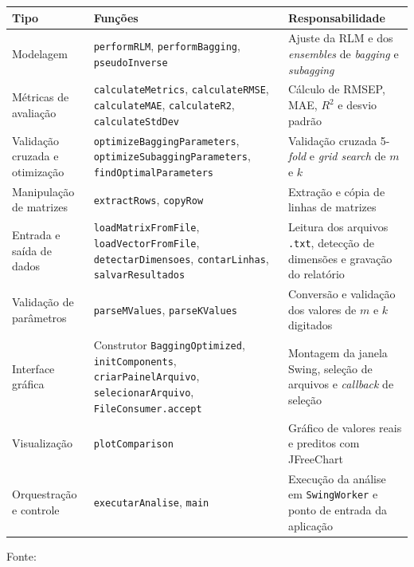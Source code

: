 \begin{quadro}[ht]
\begin{center}
\footnotesize
\captionsetup{justification=centering, labelsep=endash, width=0.75\linewidth}
\caption{Tipos de funções do sistema Java legado.}
\label{tab:tipos_java}
\begin{threeparttable}
\renewcommand{\arraystretch}{1.15}
\begin{tabularx}{\textwidth}{|>{\raggedright\arraybackslash}p{3.2cm}|>{\raggedright\arraybackslash}X|>{\raggedright\arraybackslash}X|}
\hline
\textbf{Tipo} & \textbf{Funções} & \textbf{Responsabilidade} \\ \hline
Modelagem & \texttt{performRLM}, \texttt{performBagging}, \texttt{pseudoInverse} & Ajuste da RLM e dos \textit{ensembles} de \textit{bagging} e \textit{subagging} \\ \hline
Métricas de avaliação & \texttt{calculateMetrics}, \texttt{calculateRMSE}, \texttt{calculateMAE}, \texttt{calculateR2}, \texttt{calculateStdDev} & Cálculo de RMSEP, MAE, $R^2$ e desvio padrão \\ \hline
Validação cruzada e otimização & \texttt{optimizeBaggingParameters}, \texttt{optimizeSubaggingParameters}, \texttt{findOptimalParameters} & Validação cruzada 5-\textit{fold} e \textit{grid search} de $m$ e $k$ \\ \hline
Manipulação de matrizes & \texttt{extractRows}, \texttt{copyRow} & Extração e cópia de linhas de matrizes \\ \hline
Entrada e saída de dados & \texttt{loadMatrixFromFile}, \texttt{loadVectorFromFile}, \texttt{detectarDimensoes}, \texttt{contarLinhas}, \texttt{salvarResultados} & Leitura dos arquivos \texttt{.txt}, detecção de dimensões e gravação do relatório \\ \hline
Validação de parâmetros & \texttt{parseMValues}, \texttt{parseKValues} & Conversão e validação dos valores de $m$ e $k$ digitados \\ \hline
Interface gráfica & Construtor \texttt{BaggingOptimized}, \texttt{initComponents}, \texttt{criarPainelArquivo}, \texttt{selecionarArquivo}, \texttt{FileConsumer.accept} & Montagem da janela Swing, seleção de arquivos e \textit{callback} de seleção \\ \hline
Visualização & \texttt{plotComparison} & Gráfico de valores reais e preditos com JFreeChart \\ \hline
Orquestração e controle & \texttt{executarAnalise}, \texttt{main} & Execução da análise em \texttt{SwingWorker} e ponto de entrada da aplicação \\ \hline
\end{tabularx}
\begin{tablenotes}[flushleft]
\footnotesize
\item Fonte:~\oautor
\end{tablenotes}
\end{threeparttable}
\end{center}
\end{quadro}

